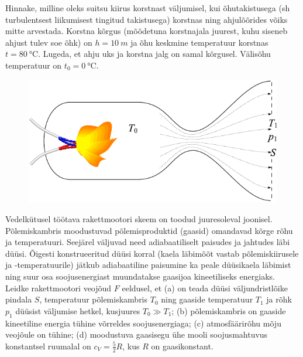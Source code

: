 \documentclass[10pt]{article}
\begin{document}
{%

Hinnake, milline oleks suitsu kiirus korstnast väljumisel, kui õhutakistusega (sh turbulentsest liikumisest tingitud takistusega) korstnas ning ahjulõõrides võiks mitte arvestada.
Korstna kõrgus (mõõdetuna korstnajala juurest, kuhu siseneb ahjust tulev soe õhk) on $h=\SI{10}{m}$ ja õhu keskmine temperatuur korstnas $t=\SI{80}{\degreeCelsius}$. Lugeda, et ahju uks ja korstna jalg on samal kõrgusel. Välisõhu temperatuur on $t_0=\SI{0}{\degreeCelsius}$.
\probend
\bigskip


\begin{figure}
	\vspace{-3ex}
	\includegraphics[width=\linewidth]{2010-lahg-10-rakettmootor}
	\vspace{-6ex}
\end{figure}
Vedelkütusel töötava rakettmootori skeem on toodud juuresoleval joonisel. Põlemiskambris moodustuvad põlemisproduktid (gaasid) omandavad kõrge rõhu ja temperatuuri. Seejärel väljuvad need adiabaatiliselt paisudes ja jahtudes läbi düüsi. Õigesti konstrueeritud düüsi korral (kaela läbimõõt vastab põlemiskiirusele ja -temperatuurile) jätkub adiabaatiline paisumine ka peale düüsikaela läbimist ning suur osa soojusenergiast muundatakse gaasijoa kineetiliseks energiaks. Leidke rakettmootori veojõud $F$ eeldusel, et (a) on teada düüsi väljundristlõike pindala $S$, temperatuur põlemiskambris $T_0$ ning gaaside temperatuur $T_1$ ja rõhk $p_1$ düüsist väljumise hetkel, kusjuures $T_0 \gg T_1$; (b) põlemiskambris on gaaside kineetiline energia tühine võrreldes soojusenergiaga; (c) atmosfäärirõhu mõju veojõule on tühine; (d) moodustuva gaasisegu ühe mooli soojusmahtuvus konstantsel ruumalal on $c_V = \frac52 R$, kus $R$ on gaasikonstant.
\probend
\bigskip
\newpage\subsection{\protect{}}

}
\end{document}
